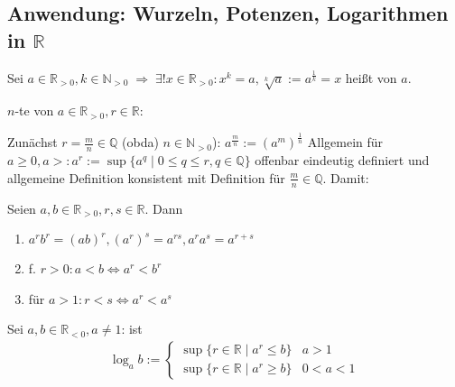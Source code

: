 \subsection{Anwendung: Wurzeln, Potenzen, Logarithmen in \texorpdfstring{$\mathbb{R}$}{R}}

\begin{proposition}[Wurzeln]
	Sei $a\in\mathbb{R}_{>0}, k\in\mathbb{N}_{>0} \;\Rightarrow \; \exists ! x\in \mathbb{R}_{>0}: x^k = a, \sqrt[k]{a}:=a^{\frac{1}{k}} = x$ heißt   von $a$.
\end{proposition}

\begin{*definition}[Potenz]
	$n$-te  von $a\in\mathbb{R}_{>0}, r\in\mathbb{R}$:
	
	Zunächst $r=\frac{m}{n}\in\mathbb{Q}$ (\gls{obda}) $n\in\mathbb{N}_{>0}$): $ a^{\frac{m}{n}}:= (a^m)^{\frac{1}{n}}$
	Allgemein für $a\ge 0, a > : a^r := \sup \{ a^q \mid 0 \le q \le r,q\in\mathbb{Q} \}$
	offenbar eindeutig definiert und allgemeine Definition konsistent mit Definition für $\frac{m}{n}\in\mathbb{Q}$.
	Damit: 
\end{*definition}

\begin{proposition}\label{proposition_potenz_r}
	Seien $a,b\in\mathbb{R}_{>0}, r,s\in\mathbb{R}$. Dann
	\begin{enumerate}[label={\arabic*)}]
		\item $a^r b^r = (ab)^r, (a^r)^s = a^{rs}, a^ra^s = a^{r+s}$
		\item f. $r > 0: a < b \Leftrightarrow a^r < b^r$
		\item für $a > 1: r < s \Leftrightarrow a^r < a^s$
	\end{enumerate}
\end{proposition}

\begin{*definition}[Logarithmus]
	Sei $a,b\in\mathbb{R}_{<0}, a\neq 1$:  ist \begin{align*}
	 \log_a b :=\begin{cases}
	 \sup \{ r \in \mathbb{R} \mid a^r \le b\}& a > 1\\
 	\sup \{r\in\mathbb{R}\mid a^r \ge b\}& 0 < a < 1
	 \end{cases}
	\end{align*}
\end{*definition}

